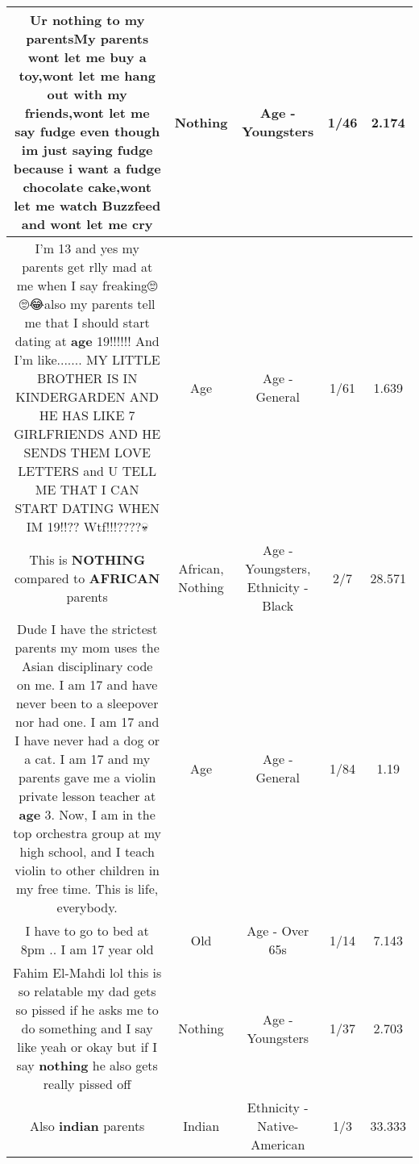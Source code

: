 \documentclass[11pt]{article}
\newlength\mylength
\begin{document}
\begin{center}
\begin{longtable}{|C{.65\mylength}|C{.30\mylength}|C{.12\mylength}|C{.12\mylength}|C{.12\mylength}|}
  \small Ur \textbf{nothing} to my parentsMy parents wont let me buy a toy,wont let me hang out with my friends,wont let me say fudge even though im just saying fudge because i want a fudge chocolate cake,wont let me watch Buzzfeed and wont let me cry\normalsize   & Nothing & Age - Youngsters & 1/46 & 2.174 \\  \hline
  \small I'm 13 and yes my parents get rlly mad at me when I say freaking🙄🙄😂also my parents tell me that I should start dating at \textbf{age} 19!!!!!! And I'm like....... MY LITTLE BROTHER IS IN KINDERGARDEN AND HE HAS LIKE 7 GIRLFRIENDS AND HE SENDS THEM LOVE LETTERS and U TELL ME THAT I CAN START DATING WHEN IM 19!!?? Wtf!!!????💀\normalsize   & Age & Age - General & 1/61 & 1.639 \\  \hline
  \small This is \textbf{NOTHING} compared to \textbf{AFRICAN} parents\normalsize   & African, Nothing & Age - Youngsters, Ethnicity - Black & 2/7 & 28.571 \\  \hline
  \small Dude I have the strictest parents my mom uses the Asian disciplinary code on me. I am 17 and have never been to a sleepover nor had one. I am 17 and I have never had a dog or a cat. I am 17 and my parents gave me a violin private lesson teacher at \textbf{age} 3. Now, I am in the top orchestra group at my high school, and I teach violin to other children in my free time. This is life, everybody.\normalsize   & Age & Age - General & 1/84 & 1.19 \\  \hline
  \small I have to go to bed at 8pm .. I am 17 year old\normalsize   & Old & Age - Over 65s & 1/14 & 7.143 \\  \hline
  \small Fahim El-Mahdi lol this is so relatable my dad gets so pissed if he asks me to do something and I say like yeah or okay but if I say \textbf{nothing} he also gets really pissed off\normalsize   & Nothing & Age - Youngsters & 1/37 & 2.703 \\  \hline
  \small Also \textbf{indian} parents\normalsize   & Indian & Ethnicity - Native-American & 1/3 & 33.333 \\  \hline

\end{longtable}
\end{center}
\end{document}
